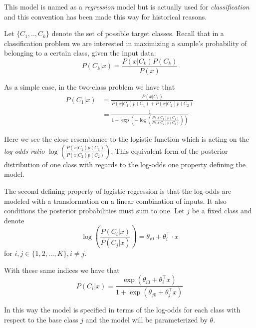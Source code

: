 This model is named as a \textit{regression} model but is actually used for \textit{classification} and this convention has been made this way for historical reasons.


Let $\{C_1,..,C_k\}$ denote the set of possible target classes.
Recall that in a classification problem we are interested in maximizing a sample's probability of belonging to a certain class, given the input data:
\begin{equation}
P(C_k| x) = \frac{P(x|C_k)P(C_k)}{P(x)}
\end{equation}

As a simple case, in the two-class problem we have that
\begin{equation}
\begin{split}
P(C_1| x) & = \frac{P(x|C_1) }{P(x|C_1)p(C_1) + P(x|C_2)p(C_2)} \\
& = \frac{1 }
{1 + \exp \left(- \log \left(  \frac{ P(x|C_1)p(C_1)}
{P(x|C_2)p(C_2)
} \right) \right)
}
\end{split}
\end{equation}

Here we see the close resemblance to the logistic function which is acting on the \textit{log-odds ratio} $ \log \left(  \frac{ P(x|C_1)p(C_1)}{P(x|C_2)p(C_2) } \right)$.
This equivalent form of the posterior distribution of one class with regards to the log-odds one property defining the model.



The second defining property of logistic regression is that the log-odds are modeled with a transformation on a linear combination of inputs.
It also conditions the posterior probabilities must sum to one.
Let $j$ be a fixed class and denote
\begin{equation}
 \log \left( \frac{P(C_i|x)}{P(C_j|x)} \right) = \theta_{i0} + \theta_i^\intercal \cdot x
 \label{logit-logOddss}
 \end{equation}
for $i,j \in \{1,2,\ldots,K\}, i\neq j$.

With these same indices we have that
\begin{equation} P(C_i|x) = \frac{\exp(\theta_{i0} + \theta_i^\intercal x)}{1 + \exp(\theta_{j0} + \theta_j^\intercal x)}
\end{equation}

In this way the model is specified in terms of the log-odds for each class with respect to the base class $j$ and the model will be parameterized by $\theta$.

